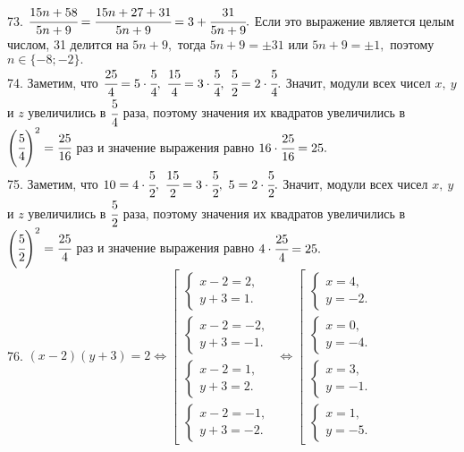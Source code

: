 73. $\cfrac{15n+58}{5n+9}=\cfrac{15n+27+31}{5n+9}=3+\cfrac{31}{5n+9}.$ Если это выражение является целым числом, 31 делится на $5n+9,$ тогда $5n+9=\pm31$ или $5n+9=\pm1,$ поэтому $n\in\{-8;-2\}.$\\
74. Заметим, что $\cfrac{25}{4}=5\cdot\cfrac{5}{4},\ \cfrac{15}{4}=3\cdot\cfrac{5}{4},\ \cfrac{5}{2}=2\cdot\cfrac{5}{4}.$ Значит, модули всех чисел $x,\ y$ и $z$ увеличились в $\cfrac{5}{4}$ раза, поэтому значения их квадратов увеличились в  $\left(\cfrac{5}{4}\right)^2=\cfrac{25}{16}$ раз и значение выражения равно $16\cdot
\cfrac{25}{16}=25.$\\
75. Заметим, что $10=4\cdot\cfrac{5}{2},\ \cfrac{15}{2}=3\cdot\cfrac{5}{2},\ 5=2\cdot\cfrac{5}{2}.$ Значит, модули всех чисел $x,\ y$ и $z$ увеличились в $\cfrac{5}{2}$ раза, поэтому значения их квадратов увеличились в  $\left(\cfrac{5}{2}\right)^2=\cfrac{25}{4}$ раз и значение выражения равно $4\cdot
\cfrac{25}{4}=25.$\\
76. $(x-2)(y+3)=2\Leftrightarrow \left[\begin{array}{l}\begin{cases}x-2=2,\\ y+3=1.\end{cases}\\ \begin{cases}x-2=-2,\\ y+3=-1.\end{cases}\\
\begin{cases}x-2=1,\\ y+3=2.\end{cases}\\ \begin{cases}x-2=-1,\\ y+3=-2.\end{cases}\end{array}\right.\Leftrightarrow
\left[\begin{array}{l}\begin{cases}x=4,\\ y=-2.\end{cases}\\ \begin{cases} x=0,\\ y=-4.\end{cases}\\
\begin{cases}x=3,\\ y=-1.\end{cases}\\ \begin{cases}x=1,\\ y=-5.\end{cases}\end{array}\right.$\\
